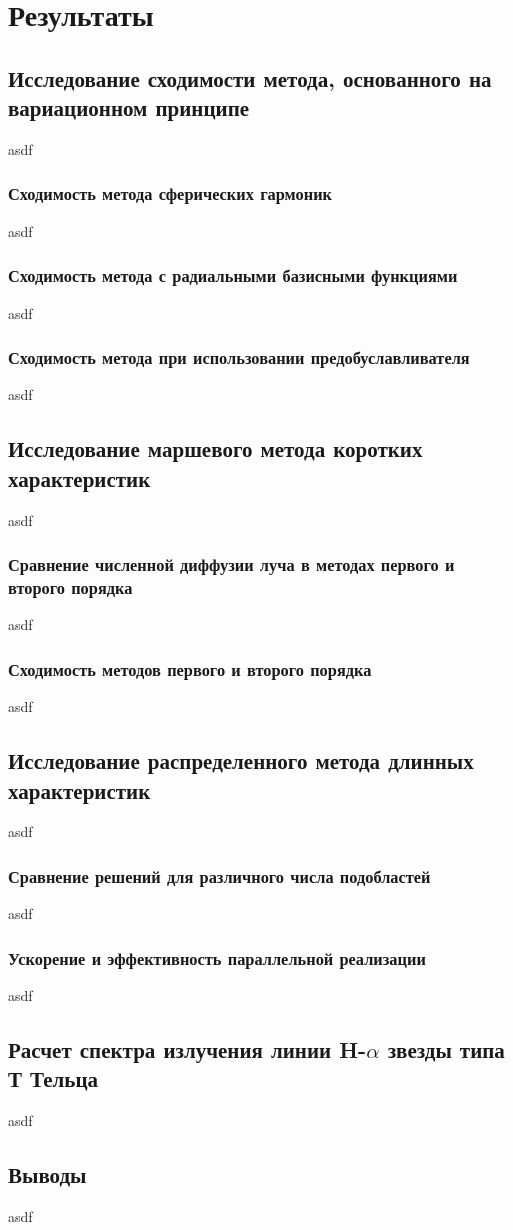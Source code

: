 \chapter{Результаты}

\section{Исследование сходимости метода, основанного на вариационном принципе}
asdf
\subsection{Сходимость метода сферических гармоник}
asdf
\subsection{Сходимость метода с радиальными базисными функциями}
asdf
\subsection{Сходимость метода при использовании предобуславливателя}
asdf

\section{Исследование маршевого метода коротких характеристик}
asdf
\subsection{Сравнение численной диффузии луча в методах первого и второго порядка}
asdf
\subsection{Сходимость методов первого и второго порядка}
asdf

\section{Исследование распределенного метода длинных характеристик}
asdf
\subsection{Сравнение решений для различного числа подобластей}
asdf
\subsection{Ускорение и эффективность параллельной реализации}
asdf

\section{Расчет спектра излучения линии H-$\alpha$ звезды типа Т Тельца}
asdf

\section{Выводы}
asdf
